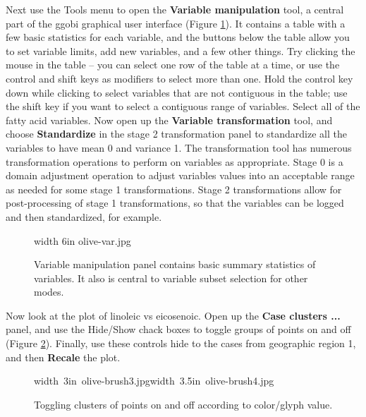 \documentclass[11pt]{article}
\begin{document}
Next use the Tools menu to open the {\bf Variable manipulation} tool,
a central part of the ggobi graphical user interface (Figure
\ref{fig4}).  It contains a table with a few basic statistics for each
variable, and the buttons below the table allow you to set variable
limits, add new variables, and a few other things.  Try clicking the
mouse in the table -- you can select one row of the table at a time,
or use the control and shift keys as modifiers to select more than
one.  Hold the control key down while clicking to select variables
that are not contiguous in the table; use the shift key if you want to
select a contiguous range of variables. Select all of the fatty acid
variables. Now open up the {\bf Variable transformation} tool, and
choose {\bf Standardize} in the stage 2 transformation panel to
standardize all the variables to have mean 0 and variance 1. The
transformation tool has numerous transformation operations to perform
on variables as appropriate. Stage 0 is a domain adjustment operation
to adjust variables values into an acceptable range as needed for some
stage 1 transformations. Stage 2 transformations allow for
post-processing of stage 1 transformations, so that the variables can
be logged and then standardized, for example.

\begin{figure}[htp]
\pdfimage width 6in {olive-var.jpg}
\caption{Variable manipulation panel contains basic summary 
statistics of variables. It also is central to variable subset selection
for other modes.
}%
\label{fig4}
\end{figure}

Now look at the plot of linoleic vs eicosenoic. Open up the {\bf Case
clusters ...} panel, and use the Hide/Show chack boxes to toggle
groups of points on and off (Figure \ref{fig5}). Finally, use these
controls hide to the cases from geographic region 1, and then {\bf
Recale} the plot.

\begin{figure}[htp]
\hbox{\pdfimage width 3in {olive-brush3.jpg}\pdfimage width 3.5in {olive-brush4.jpg}}
\caption{Toggling clusters of points on and off according to color/glyph value.}
\label{fig5}
\end{figure}
\end{document}
